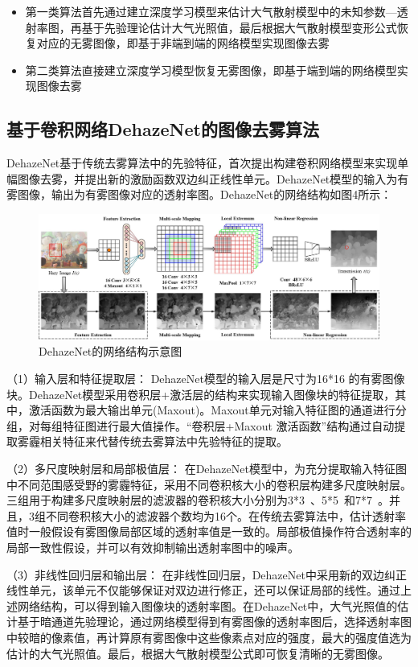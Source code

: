 \documentclass[12pt]{article}
\begin{document}
\begin{itemize}
    \item 第一类算法首先通过建立深度学习模型来估计大气散射模型中的未知参数—透射率图，再基于先验理论估计大气光照值，最后根据大气散射模型变形公式恢复对应的无雾图像，即基于非端到端的网络模型实现图像去雾
    \item 第二类算法直接建立深度学习模型恢复无雾图像，即基于端到端的网络模型实现图像去雾
\end{itemize}

\subsection{基于卷积网络DehazeNet的图像去雾算法}
DehazeNet基于传统去雾算法中的先验特征，首次提出构建卷积网络模型来实现单幅图像去雾，并提出新的激励函数双边纠正线性单元。DehazeNet模型的输入为有雾图像，输出为有雾图像对应的透射率图。DehazeNet的网络结构如图4所示：
\begin{figure}[h]
    \centering
    \includegraphics[width=\textwidth]{pic/pic4.png}
    \caption{DehazeNet的网络结构示意图}
\end{figure}


（1）输入层和特征提取层：
DehazeNet模型的输入层是尺寸为16*16 的有雾图像块。DehazeNet模型采用卷积层+激活层的结构来实现输入图像块的特征提取，其中，激活函数为最大输出单元(Maxout)。Maxout单元对输入特征图的通道进行分组，对每组特征图进行最大值操作。“卷积层+Maxout 激活函数”结构通过自动提取雾霾相关特征来代替传统去雾算法中先验特征的提取。

（2）多尺度映射层和局部极值层：
在DehazeNet模型中，为充分提取输入特征图中不同范围感受野的雾霾特征，采用不同卷积核大小的卷积层构建多尺度映射层。三组用于构建多尺度映射层的滤波器的卷积核大小分别为3*3 、5*5 和7*7 。并且，3组不同卷积核大小的滤波器个数均为16个。在传统去雾算法中，估计透射率值时一般假设有雾图像局部区域的透射率值是一致的。局部极值操作符合透射率的局部一致性假设，并可以有效抑制输出透射率图中的噪声。

（3）非线性回归层和输出层：
在非线性回归层，DehazeNet中采用新的双边纠正线性单元，该单元不仅能够保证对双边进行修正，还可以保证局部的线性。通过上述网络结构，可以得到输入图像块的透射率图。在DehazeNet中，大气光照值的估计基于暗通道先验理论，通过网络模型得到有雾图像的透射率图后，选择透射率图中较暗的像素值，再计算原有雾图像中这些像素点对应的强度，最大的强度值选为估计的大气光照值。最后，根据大气散射模型公式即可恢复清晰的无雾图像。
\end{document}
